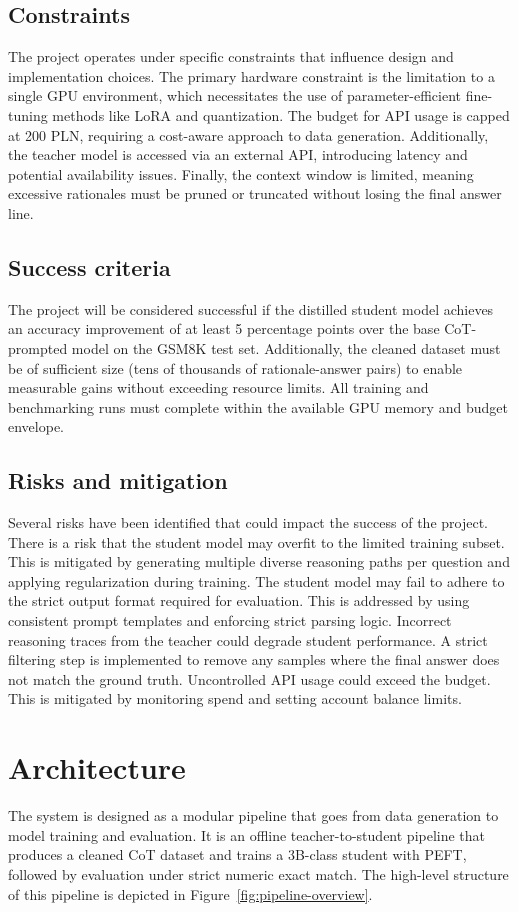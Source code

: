 \subsection{Constraints}
The project operates under specific constraints that influence design and implementation choices. The primary hardware constraint is the limitation to a single GPU environment, which necessitates the use of parameter-efficient fine-tuning methods like LoRA and quantization. The budget for API usage is capped at 200 PLN, requiring a cost-aware approach to data generation. Additionally, the teacher model is accessed via an external API, introducing latency and potential availability issues. Finally, the context window is limited, meaning excessive rationales must be pruned or truncated without losing the final answer line.

\subsection{Success criteria}
The project will be considered successful if the distilled student model achieves an accuracy improvement of at least 5 percentage points over the base CoT-prompted model on the GSM8K test set. Additionally, the cleaned dataset must be of sufficient size (tens of thousands of rationale-answer pairs) to enable measurable gains without exceeding resource limits. All training and benchmarking runs must complete within the available GPU memory and budget envelope.

\subsection{Risks and mitigation}
Several risks have been identified that could impact the success of the project. There is a risk that the student model may overfit to the limited training subset. This is mitigated by generating multiple diverse reasoning paths per question and applying regularization during training. The student model may fail to adhere to the strict output format required for evaluation. This is addressed by using consistent prompt templates and enforcing strict parsing logic. Incorrect reasoning traces from the teacher could degrade student performance. A strict filtering step is implemented to remove any samples where the final answer does not match the ground truth. Uncontrolled API usage could exceed the budget. This is mitigated by monitoring spend and setting account balance limits.

\section{Architecture}
The system is designed as a modular pipeline that goes from data generation to model training and evaluation. It is an offline teacher-to-student pipeline that produces a cleaned CoT dataset and trains a 3B-class student with PEFT, followed by evaluation under strict numeric exact match. The high-level structure of this pipeline is depicted in Figure~\ref{fig:pipeline-overview}.


